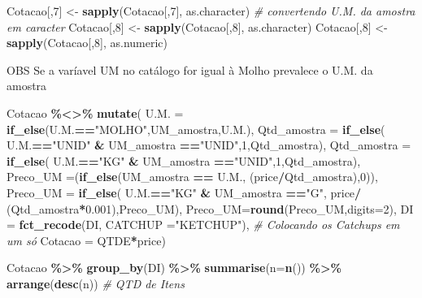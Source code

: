 \documentclass[
]{article}
\newenvironment{Shaded}{\begin{snugshade}}{\end{snugshade}}
\newcommand{\CommentTok}[1]{\textcolor[rgb]{0.56,0.35,0.01}{\textit{#1}}}
\newcommand{\DataTypeTok}[1]{\textcolor[rgb]{0.13,0.29,0.53}{#1}}
\newcommand{\DecValTok}[1]{\textcolor[rgb]{0.00,0.00,0.81}{#1}}
\newcommand{\FloatTok}[1]{\textcolor[rgb]{0.00,0.00,0.81}{#1}}
\newcommand{\KeywordTok}[1]{\textcolor[rgb]{0.13,0.29,0.53}{\textbf{#1}}}
\newcommand{\NormalTok}[1]{#1}
\newcommand{\OperatorTok}[1]{\textcolor[rgb]{0.81,0.36,0.00}{\textbf{#1}}}
\newcommand{\StringTok}[1]{\textcolor[rgb]{0.31,0.60,0.02}{#1}}
\begin{document}
\begin{Shaded}
\begin{Highlighting}[]
                         
\NormalTok{Cotacao[,}\DecValTok{7}\NormalTok{] \textless{}{-}}\StringTok{ }\KeywordTok{sapply}\NormalTok{(Cotacao[,}\DecValTok{7}\NormalTok{], as.character) }\CommentTok{\# convertendo U.M. da amostra em caracter}
\NormalTok{Cotacao[,}\DecValTok{8}\NormalTok{] \textless{}{-}}\StringTok{ }\KeywordTok{sapply}\NormalTok{(Cotacao[,}\DecValTok{8}\NormalTok{], as.character)}
\NormalTok{Cotacao[,}\DecValTok{8}\NormalTok{] \textless{}{-}}\StringTok{ }\KeywordTok{sapply}\NormalTok{(Cotacao[,}\DecValTok{8}\NormalTok{], as.numeric)}
\end{Highlighting}
\end{Shaded}

OBS Se a varíavel UM no catálogo for igual à Molho prevalece o U.M. da
amostra

\begin{Shaded}
\begin{Highlighting}[]
\NormalTok{  Cotacao }\OperatorTok{\%\textless{}\textgreater{}\%}\StringTok{ }\KeywordTok{mutate}\NormalTok{(}
  \DataTypeTok{U.M. =} \KeywordTok{if\_else}\NormalTok{(U.M.}\OperatorTok{==}\StringTok{"MOLHO"}\NormalTok{,UM\_amostra,U.M.),}
  \DataTypeTok{Qtd\_amostra =} \KeywordTok{if\_else}\NormalTok{( U.M.}\OperatorTok{==}\StringTok{"UNID"} \OperatorTok{\&}\StringTok{ }\NormalTok{UM\_amostra }\OperatorTok{==}\StringTok{"UNID"}\NormalTok{,}\DecValTok{1}\NormalTok{,Qtd\_amostra),}
  \DataTypeTok{Qtd\_amostra =} \KeywordTok{if\_else}\NormalTok{( U.M.}\OperatorTok{==}\StringTok{"KG"} \OperatorTok{\&}\StringTok{ }\NormalTok{UM\_amostra }\OperatorTok{==}\StringTok{"UNID"}\NormalTok{,}\DecValTok{1}\NormalTok{,Qtd\_amostra),}
  \DataTypeTok{Preco\_UM =}\NormalTok{(}\KeywordTok{if\_else}\NormalTok{(UM\_amostra }\OperatorTok{==}\StringTok{ }\NormalTok{U.M., (price}\OperatorTok{/}\NormalTok{Qtd\_amostra),}\DecValTok{0}\NormalTok{)),}
  \DataTypeTok{Preco\_UM =} \KeywordTok{if\_else}\NormalTok{( U.M.}\OperatorTok{==}\StringTok{"KG"} \OperatorTok{\&}\StringTok{ }\NormalTok{UM\_amostra }\OperatorTok{==}\StringTok{"G"}\NormalTok{,}
\NormalTok{                      price}\OperatorTok{/}\StringTok{ }\NormalTok{(Qtd\_amostra}\OperatorTok{*}\FloatTok{0.001}\NormalTok{),Preco\_UM),}
  \DataTypeTok{Preco\_UM=}\KeywordTok{round}\NormalTok{(Preco\_UM,}\DataTypeTok{digits=}\DecValTok{2}\NormalTok{),}
  \DataTypeTok{DI =} \KeywordTok{fct\_recode}\NormalTok{(DI, }\DataTypeTok{CATCHUP =}\StringTok{"KETCHUP"}\NormalTok{), }\CommentTok{\# Colocando os Catchups em um só}
  \DataTypeTok{Cotacao =}\NormalTok{ QTDE}\OperatorTok{*}\NormalTok{price)  }
  
\NormalTok{  Cotacao }\OperatorTok{\%\textgreater{}\%}\StringTok{ }\KeywordTok{group\_by}\NormalTok{(DI) }\OperatorTok{\%\textgreater{}\%}\StringTok{ }\KeywordTok{summarise}\NormalTok{(}\DataTypeTok{n=}\KeywordTok{n}\NormalTok{()) }\OperatorTok{\%\textgreater{}\%}\StringTok{ }\KeywordTok{arrange}\NormalTok{(}\KeywordTok{desc}\NormalTok{(n))  }\CommentTok{\# QTD de Itens}
\end{Highlighting}
\end{Shaded}
\end{document}
